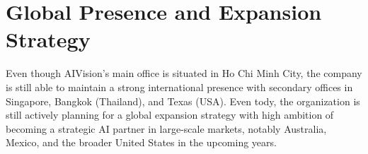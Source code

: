 \section{Global Presence and Expansion Strategy}

Even though AIVision's main office is situated in Ho Chi Minh City, the company is still able to maintain a strong international presence with secondary offices in Singapore, Bangkok (Thailand), and Texas (USA). Even tody, the organization is still actively planning for a global expansion strategy with high ambition of becoming a strategic AI partner in large-scale markets, notably Australia, Mexico, and the broader United States in the upcoming years.
